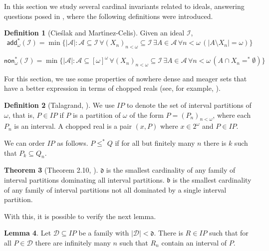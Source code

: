 \documentclass{amsart}
\theoremstyle{definition}
\newtheorem{theorem}{Theorem}[section]
\newtheorem{definition}[theorem]{Definition}
\newtheorem{lemma}[theorem]{Lemma}
\theoremstyle{remark}
\numberwithin{equation}{section}
\newcommand{\add}{\mathsf{add}}
\newcommand{\non}{\mathsf{non}}
\newcommand{\id}{\mathcal{I}}
\begin{document}
In this section we study several cardinal invariants related to ideals, answering questions posed in \cite{poke}, where the following definitions were introduced.


\begin{definition}[Cie{\'s}lak and Mart{\'\i}nez-Celis]\label{*-omega}
    Given an ideal $\id$,
    \[
    \add_\omega^*(\id)=\min\{ |\mathcal{A}|: \mathcal{A}\subseteq \id \,\forall (X_n)_{n<\omega}\subseteq \id \,\exists A\in \mathcal{A} \,\forall n<\omega\, (|A\setminus X_n|=\omega)\}
    \]

    \[
    \non_\omega^*(\id)= \min\{|\mathcal{A}|: \mathcal A \subseteq [\omega]^\omega\,\forall(X_n)_{n<\omega}\subseteq \id \,\exists A\in \mathcal{A} \,\forall n<\omega \,(A\cap X_n=^*\emptyset) \}
    \]
\end{definition}

For this section, we use some properties of nowhere dense and meager sets that have a better expression in terms of chopped reals (see, for example, \cite{combinatorial}).

\begin{definition}[Talagrand, \cite{talagrand}]
    We use $IP$ to denote the set of interval partitions of $\omega$, that is, $P\in IP$ if $P$ is a partition of $\omega$ of the form $P=(P_n)_{n<\omega}$, where each $P_n$ is an interval. A chopped real is a pair $(x,P)$ where $x\in 2^\omega$ and $P\in IP$.
\end{definition}

We can order $IP$ as follows. $P\leq^* Q$ if for all but finitely many $n$ there is $k$ such that $P_k\subseteq Q_n$.

\begin{theorem}[Theorem 2.10, \cite{cccc}]
    \(\mathfrak{d}\) is the smallest cardinality of any family of interval partitions dominating all interval partitions. \(\mathfrak{b}\) is the smallest cardinality of any family of interval partitions not all dominated by a single interval partition.
\end{theorem}

With this, it is possible to verify the next lemma.

\begin{lemma} \label{d-part}
    Let $\mathcal{D}\subseteq IP$ be a family with $|\mathcal{D}|<\mathfrak{d}$. There is $R\in IP$ such that for all $P\in \mathcal{D}$ there are infinitely many $n$ such that $R_n$ contain an interval of $P$. 

\end{lemma}
\end{document}
